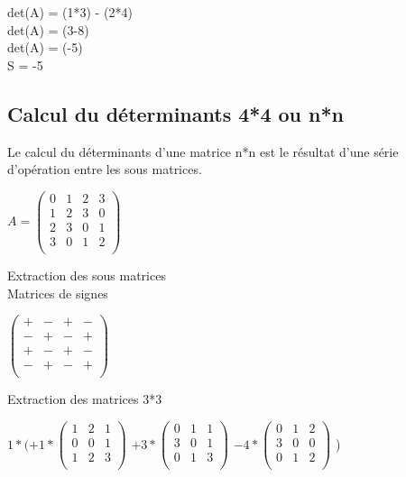 det(A) = (1*3) - (2*4)\\

det(A) = (3-8)\\

det(A) = (-5)\\

S = -5\\

\subsection{Calcul du déterminants 4*4 ou n*n}
\vspace{5mm} %
Le calcul du déterminants d'une matrice n*n est le résultat d'une série d'opération entre les sous matrices.
\vspace{5mm} %

$
A =
\begin{pmatrix}
  0 & 1 & 2 & 3 \\
  1 & 2 & 3 & 0 \\
  2 & 3 & 0 & 1 \\
  3 & 0 & 1 & 2 \\
\end{pmatrix}
$

\vspace{10mm} %

Extraction des sous matrices \\

\vspace{5mm} %
Matrices de signes

\vspace{4mm} %

$
\begin{pmatrix}
  + & - & + & -\\
  - & + & - & +\\
  + & - & + & -\\
  - & + & - & +\\
\end{pmatrix}
$

\vspace{8mm} %
Extraction des matrices 3*3
\vspace{5mm} %

$
1*(
  +1*
  \begin{pmatrix}
    1 & 2 & 1 \\
    0 & 0 & 1 \\
    1 & 2 & 3 \\
  \end{pmatrix}
  $
  $
  +3*
  \begin{pmatrix}
    0 & 1 & 1 \\
    3 & 0 & 1 \\
    0 & 1 & 3 \\
  \end{pmatrix}
  $
  $
  -4*
  \begin{pmatrix}
    0 & 1 & 2 \\
    3 & 0 & 0 \\
    0 & 1 & 2 \\
  \end{pmatrix}
  $
)

